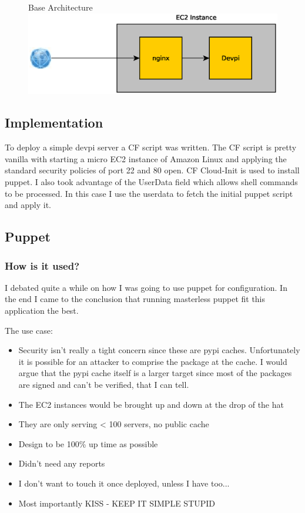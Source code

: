 \documentclass[12pt, letterpaper]{article}
\begin{document}
\begin{figure}[H]
    \centering
    Base Architecture
    \includegraphics[width=\textwidth]{figures/base_arch.eps}
\end{figure}


\subsection{Implementation}
To deploy a simple devpi server a CF script was written. The CF script
is pretty vanilla with starting a micro EC2 instance of Amazon Linux and applying the standard security policies of
port 22 and 80 open. CF Cloud-Init is used to install puppet. I also took advantage of the UserData field which
allows shell commands to be processed. In this case I use the userdata to fetch the initial puppet script and apply it.


\subsection{Puppet}
\subsubsection{How is it used?}
I debated quite a while on how I was going to use puppet for configuration. In the end I came to the conclusion that
running masterless puppet fit this application the best.  

The use case:
\begin{itemize}
    \item Security isn't really a tight concern since these are pypi caches. Unfortunately it is possible for an attacker
        to comprise the package at the cache. I would argue that the pypi cache itself is a larger target since most of
        the packages are signed and can't be verified, that I can tell.
    \item The EC2 instances would be brought up and down at the drop of the hat
    \item They are only serving < 100 servers, no public cache
    \item Design to be 100\% up time as possible 
    \item Didn't need any reports
    \item I don't want to touch it once deployed, unless I have too... 
    \item Most importantly KISS - KEEP IT SIMPLE STUPID
\end{itemize}
\end{document}
